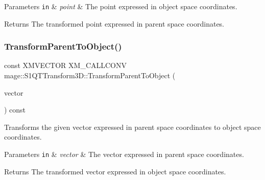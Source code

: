 \begin{DoxyParams}[1]{Parameters}
\mbox{\tt in}  & {\em point} & The point expressed in object space coordinates. \\
\hline
\end{DoxyParams}
\begin{DoxyReturn}{Returns}
The transformed point expressed in parent space coordinates. 
\end{DoxyReturn}
\mbox{\label{classmage_1_1_s1_q_t_transform3_d_a53b1794449267e88858e6c955212a855}} 
\subsubsection{\texorpdfstring{Transform\+Parent\+To\+Object()}{TransformParentToObject()}}
{\footnotesize\ttfamily const X\+M\+V\+E\+C\+T\+OR X\+M\+\_\+\+C\+A\+L\+L\+C\+O\+NV mage\+::\+S1\+Q\+T\+Transform3\+D\+::\+Transform\+Parent\+To\+Object (\begin{DoxyParamCaption}\item[{F\+X\+M\+V\+E\+C\+T\+OR}]{vector }\end{DoxyParamCaption}) const\hspace{0.3cm}{\ttfamily [noexcept]}}

Transforms the given vector expressed in parent space coordinates to object space coordinates.


\begin{DoxyParams}[1]{Parameters}
\mbox{\tt in}  & {\em vector} & The vector expressed in parent space coordinates. \\
\hline
\end{DoxyParams}
\begin{DoxyReturn}{Returns}
The transformed vector expressed in object space coordinates. 
\end{DoxyReturn}
\mbox{\label{classmage_1_1_s1_q_t_transform3_d_ab3acc5abd348f393ba2363e1b912baf5}} 
